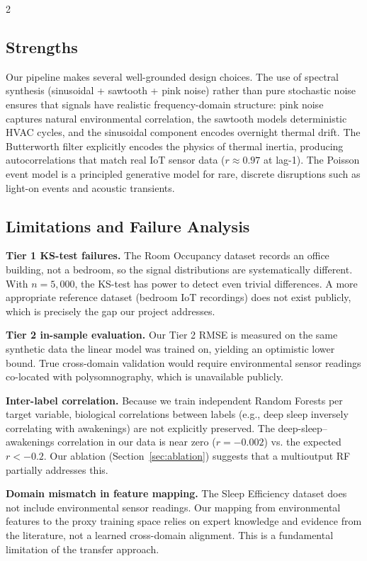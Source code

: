 \documentclass[11pt,a4paper]{article}
\begin{document}
\begin{multicols}{2}
\subsection{Strengths}

Our pipeline makes several well-grounded design choices.  The use of spectral
synthesis (sinusoidal + sawtooth + pink noise) rather than pure stochastic
noise ensures that signals have realistic frequency-domain structure: pink
noise captures natural environmental correlation, the sawtooth models
deterministic HVAC cycles, and the sinusoidal component encodes overnight
thermal drift.  The Butterworth filter explicitly encodes the physics of
thermal inertia, producing autocorrelations that match real IoT sensor data
($r \approx 0.97$ at lag-1).  The Poisson event model is a principled
generative model for rare, discrete disruptions such as light-on events and
acoustic transients.

\subsection{Limitations and Failure Analysis}

\textbf{Tier 1 KS-test failures.}
The Room Occupancy dataset records an office building, not a bedroom, so the
signal distributions are systematically different.  With $n = 5{,}000$, the
KS-test has power to detect even trivial differences.  A more appropriate
reference dataset (bedroom IoT recordings) does not exist publicly, which is
precisely the gap our project addresses.

\textbf{Tier 2 in-sample evaluation.}
Our Tier 2 RMSE is measured on the same synthetic data the linear model was
trained on, yielding an optimistic lower bound.  True cross-domain validation
would require environmental sensor readings co-located with polysomnography,
which is unavailable publicly.

\textbf{Inter-label correlation.}
Because we train independent Random Forests per target variable, biological
correlations between labels (e.g., deep sleep inversely correlating with
awakenings) are not explicitly preserved.  The deep-sleep–awakenings
correlation in our data is near zero ($r = -0.002$) vs. the expected $r < -0.2$.
Our ablation (Section~\ref{sec:ablation}) suggests that a multioutput RF
partially addresses this.

\textbf{Domain mismatch in feature mapping.}
The Sleep Efficiency dataset does not include environmental sensor readings.
Our mapping from environmental features to the proxy training space relies
on expert knowledge and evidence from the literature, not a learned cross-domain
alignment.  This is a fundamental limitation of the transfer approach.


\end{multicols}
\end{document}
